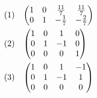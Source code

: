\documentclass[dvipdfmx,uplatex]{jsarticle}
\begin{document}
  \begin{equation}
    \begin{aligned}
        &(1)\hspace{3mm}\begin{pmatrix} 1 & 0 & \frac{11}{7} & \frac{11}{7}\\ 0 & 1 & -\frac{1}{7} & -\frac{2}{7}\\ \end{pmatrix}\nonumber\\
        &(2)\hspace{3mm}\begin{pmatrix} 1 & 0 & 1 & 0\\ 0 & 1 & -1 & 0\\ 0 & 0 & 0 & 1\\ \end{pmatrix}\nonumber\\
        &(3)\hspace{3mm}\begin{pmatrix} 1 & 0 & 1 & -1\\ 0 & 1 & -1 & 1\\ 0 & 0 & 0 & 0\\ \end{pmatrix}\nonumber\\
      \end{aligned}
  \end{equation}
\end{document}
